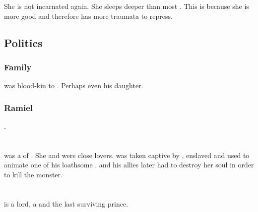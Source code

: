 She is not incarnated again. 
She sleeps deeper than most \malachim. 
This is because she is more good and therefore has more traumata to repress. 









\subsection{Politics}





\subsubsection{Family}
\Eryal was blood-kin to . 
Perhaps even his daughter. 





\subsubsection{Ramiel}
. 















\section{\Sevestris}
\index{\Sevestris}
\Sevestris was a \thelyad \resvil of \Kezerad. 
She and \Sithiyacaan were close lovers. 
\Sevestris was taken captive by \Secherdamon, enslaved and used to animate one of his loathsome \reptilecolossi.
\Sithiyacaan and his allies later had to destroy her soul in order to kill the monster.















\section[Sithiyacan]{\Sithiyacaan}
\index{\Sithiyacaan}
\Sithiyacaan is a \resphan lord, a \sathariah and the last surviving  prince. 

